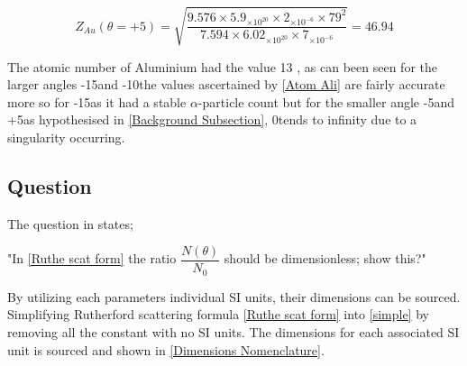 \documentclass[12pt]{article}
\begin{document}
\begin{equation}
{Z_{Au}} (\theta = +5) = \sqrt{\dfrac{9.576 \times 5.9_{\times10^{20}} \times 2_{\times10^{-6}} \times 79^2}{7.594 \times 6.02_{\times10^{20}} \times 7_{\times10^{-6}}}} = 46.94
\end{equation} 
\vspace{0.2cm}

The atomic number of Aluminium had the value 13 \cite{CRC}, as can been seen for the larger angles -15\textdegree and -10\textdegree the values ascertained by \cref{Atom Ali} are fairly accurate more so for -15\textdegree as it had a stable $\alpha$-particle count but for the smaller angle -5\textdegree and +5\textdegree as hypothesised in \cref{Background Subsection}, 0\textdegree tends to infinity due to a singularity occurring. 

\subsection{Question}
\label{Question Findings}

The question in \cite{Exp.6-2019} states; \\

\begin{centering}
"In \cref{Ruthe scat form} the ratio $\dfrac{N(\theta)}{N_0}$ should be dimensionless; show this?" \\
\end{centering}
\vspace{0.5cm}

By utilizing each parameters individual SI units, their dimensions can be sourced. Simplifying Rutherford scattering formula \cref{Ruthe scat form} into 
\cref{simple} by removing all the constant with no SI units. The dimensions for each associated SI unit is sourced \cite{CRC} and shown in \cref{Dimensions Nomenclature}.
\end{document}
